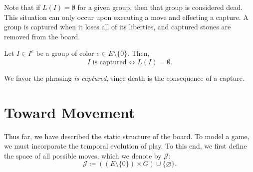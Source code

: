 Note that if $L(I) = \emptyset$ for a given group, then that group is considered dead. This situation can only occur upon executing a move and effecting a capture. A group is captured when it loses all of its liberties, and captured stones are removed from the board.

\begin{definition}
	Let $I \in I^e$ be a group of color $e \in E \setminus \{0\}$. Then,
	\[
	I \text{ is captured} \iff L(I) = \emptyset.
	\]
\end{definition}

We favor the phrasing \textit{is captured}, since death is the consequence of a capture.

\section{Toward Movement}

Thus far, we have described the static structure of the board. To model a game, we must incorporate the temporal evolution of play. To this end, we first define the space of all possible moves, which we denote by $\mathcal{J}$:
$$\mathcal{J} \coloneqq \left((E \setminus \{0\}) \times G\right) \cup \{\varnothing\}.$$

